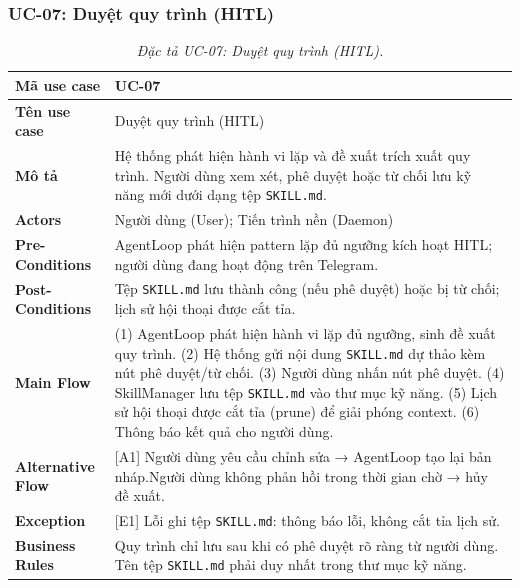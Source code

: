 \subsubsection{UC-07: Duyệt quy trình (HITL)}
\label{subsec:spec-uc07}
\renewcommand{\arraystretch}{1.4}
\begin{longtable}{|>{\bfseries}p{3.5cm}|p{10.5cm}|}
  \caption{\emph{Đặc tả UC-07: Duyệt quy trình (HITL).}} \label{tab:spec-uc07} \\
  \hline
  Mã use case      & UC-07 \\ \hline
  Tên use case     & Duyệt quy trình (HITL) \\ \hline
  Mô tả            & Hệ thống phát hiện hành vi lặp và đề xuất trích xuất quy trình. Người dùng xem xét, phê duyệt hoặc từ chối lưu kỹ năng mới dưới dạng tệp \texttt{SKILL.md}. \\ \hline
  Actors           & Người dùng (User); Tiến trình nền (Daemon) \\ \hline
  Pre-Conditions   & AgentLoop phát hiện pattern lặp đủ ngưỡng kích hoạt HITL; người dùng đang hoạt động trên Telegram. \\ \hline
  Post-Conditions  & Tệp \texttt{SKILL.md} lưu thành công (nếu phê duyệt) hoặc bị từ chối; lịch sử hội thoại được cắt tỉa. \\ \hline
  Main Flow        & (1) AgentLoop phát hiện hành vi lặp đủ ngưỡng, sinh đề xuất quy trình.\newline
                     (2) Hệ thống gửi nội dung \texttt{SKILL.md} dự thảo kèm nút phê duyệt/từ chối.\newline
                     (3) Người dùng nhấn nút phê duyệt.\newline
                     (4) SkillManager lưu tệp \texttt{SKILL.md} vào thư mục kỹ năng.\newline
                     (5) Lịch sử hội thoại được cắt tỉa (prune) để giải phóng context.\newline
                     (6) Thông báo kết quả cho người dùng. \\ \hline
  Alternative Flow & [A1] Người dùng yêu cầu chỉnh sửa → AgentLoop tạo lại bản nháp.\newline
                     [A2] Người dùng không phản hồi trong thời gian chờ → hủy đề xuất. \\ \hline
  Exception        & [E1] Lỗi ghi tệp \texttt{SKILL.md}: thông báo lỗi, không cắt tỉa lịch sử. \\ \hline
  Business Rules   & Quy trình chỉ lưu sau khi có phê duyệt rõ ràng từ người dùng.\newline
                     Tên tệp \texttt{SKILL.md} phải duy nhất trong thư mục kỹ năng. \\ \hline
\end{longtable}

